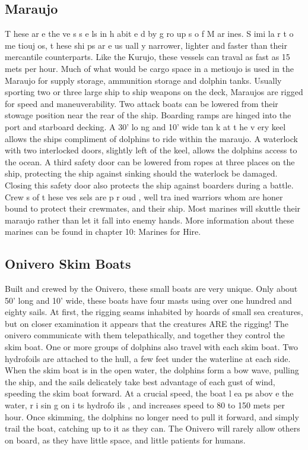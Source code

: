 \begin{multicols*}{2}
\subsection{Maraujo}
T hese ar e the ve s s e ls in h abit e d by g ro up s o f
M ar ines. S imi la r t o me tiouj os, t hese shi ps ar e us uall y
narrower, lighter and faster than their mercantile counterparts.
Like the Kurujo, these vessels can traval as fast as 15 mets
per hour. Much of what would be cargo space in a metioujo is
used in the Maraujo for supply storage, ammunition storage
and dolphin tanks.
Usually sporting two or three large ship to ship
weapons on the deck, Maraujos are rigged for speed and
maneuverability. Two attack boats can be lowered from their
stowage position near the rear of the ship. Boarding ramps are
hinged into the port and starboard decking.
A 30’ lo ng and 10’ wide tan k at t he v ery keel
allows the ships compliment of dolphins to ride within the
maraujo. A waterlock with two interlocked doors, slightly left
of the keel, allows the dolphins access to the ocean. A third
safety door can be lowered from ropes at three places on the
ship, protecting the ship against sinking should the waterlock
be damaged. Closing this safety door also protects the ship
against boarders during a battle.
Crew s of t hese ves sels are p r oud , well tra ined
warriors whom are honer bound to protect their crewmates,
and their ship. Most marines will skuttle their maraujo rather
than let it fall into enemy hands. More information about
these marines can be found in chapter 10: Marines for Hire.
\subsection{Onivero Skim Boats}
Built and crewed by the Onivero, these small boats
are very unique. Only about 50’ long and 10’ wide, these
boats have four masts using over one hundred and eighty
sails. At first, the rigging seams inhabited by hoards of small
sea creatures, but on closer examination it appears that the
creatures ARE the rigging! The onivero communicate with
them telepathically, and together they control the skim boat.
One or more groups of dolphins also travel with each skim
boat.
Two hydrofoils are attached to the hull, a few feet
under the waterline at each side. When the skim boat is in the
open water, the dolphins form a bow wave, pulling the ship,
and the sails delicately take best advantage of each gust of
wind, speeding the skim boat forward. At a crucial speed, the
boat l ea ps abov e the water, r i sin g on i ts hydrofo ils , and
increases speed to 80 to 150 mets per hour. Once skimming,
the dolphins no longer need to pull it forward, and simply
trail the boat, catching up to it as they can.
The Onivero will rarely allow others on board, as
they have little space, and little patients for humans.

\end{multicols*}

